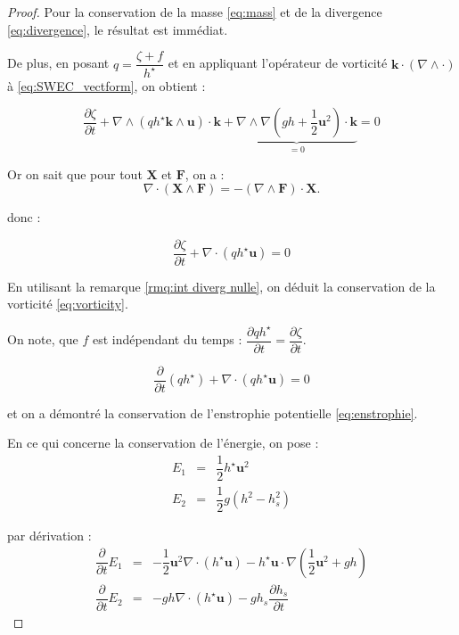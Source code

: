 \begin{proof}
Pour la conservation de la masse \eqref{eq:mass} et de la divergence \eqref{eq:divergence}, le résultat est immédiat.

De plus, en posant $q = \dfrac{\zeta+f}{h^{\star}}$ et en appliquant l'opérateur de vorticité $\mathbf{k} \cdot \left( \nabla \wedge \cdot \right)$ à \eqref{eq:SWEC_vectform}, on obtient :

$$
\dfrac{\partial \zeta}{\partial t}+\nabla \wedge \left( q h^{\star} \mathbf{k} \wedge \mathbf{u} \right) \cdot\mathbf{k} + \underbrace{\nabla \wedge \nabla \left( gh + \dfrac{1}{2}\mathbf{u}^2 \right) \cdot \mathbf{k}}_{=0} = 0 
$$

Or on sait que pour tout $\mathbf{X}$ et $\mathbf{F}$, on a :
\begin{equation}
\nabla \cdot \left( \mathbf{X} \wedge \mathbf{F} \right) = - \left( \nabla \wedge \mathbf{F} \right) \cdot \mathbf{X}.
\end{equation}

donc :

$$
\dfrac{ \partial \zeta}{\partial t} + \nabla \cdot \left( q h^{\star} \mathbf{u} \right) = 0
$$

En utilisant la remarque \ref{rmq:int diverg nulle}, on déduit la conservation de la vorticité \eqref{eq:vorticity}.

On note, que $f$ est indépendant du temps : $\dfrac{\partial q h^{\star}}{\partial t
} = \dfrac{\partial \zeta}{\partial t}$.

$$
\dfrac{\partial}{\partial t} \left( q h^{\star} \right) + \nabla \cdot \left( q h^{\star} \mathbf{u} \right) = 0
$$

et on a démontré la conservation de l'enstrophie potentielle \eqref{eq:enstrophie}.

En ce qui concerne la conservation de l'énergie, on pose :
\begin{equation}
\begin{array}{rcl}
E_1 & = & \dfrac{1}{2} h^{\star} \mathbf{u}^2 \\
E_2 & = & \dfrac{1}{2} g \left( h^2 - h_s^2 \right)
\end{array}
\end{equation}

par dérivation :
\begin{equation}
\begin{array}{rcl}
\dfrac{\partial}{\partial t} E_1 & = & -\dfrac{1}{2} \mathbf{u}^2 \nabla \cdot \left( h^{\star} \mathbf{u} \right) - h^{\star} \mathbf{u} \cdot \nabla \left( \dfrac{1}{2} \mathbf{u}^2 + gh \right) \\
\dfrac{\partial}{\partial t} E_2 & = & - gh \nabla \cdot \left( h^{\star} \mathbf{u} \right) - g h_s \dfrac{\partial h_s}{\partial t} 
\end{array}
\end{equation}


\end{proof}
